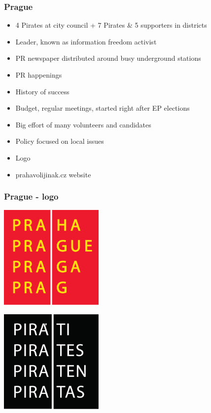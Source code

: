 \begin{frame}
	\frametitle{Prague}
	\begin{itemize}
		\item 4 Pirates at city council + 7 Pirates \& 5 supporters in districts
		\item Leader, known as information freedom activist
		\item PR newspaper distributed around busy underground stations
		\item PR happenings
		\item History of success
		\item Budget, regular meetings, started right after EP elections
		\item Big effort of many volunteers and candidates
		\item Policy focused on local issues
		\item Logo
		\item prahavolijinak.cz website
	\end{itemize}
\end{frame}
\begin{frame}
	\frametitle{Prague - logo}
	\begin{center}
	\begin{multicols}{2}
		\includegraphics[width = 0.38\textwidth]{Praha.eps}
		
		\includegraphics[width = 0.38\textwidth]{logo_pirati.eps}
	\end{multicols}
	\end{center}
\end{frame}
